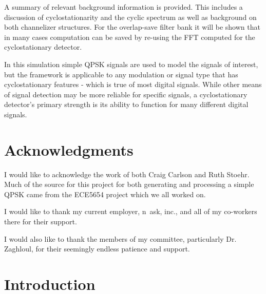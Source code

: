 \documentclass[12pt,dvips]{report}
\begin{document}
A summary of relevant background information is provided.  This includes a
discussion of cyclostationarity and the cyclic spectrum as well as background
on both channelizer structures. For the overlap-save filter bank it will be 
shown that in many cases computation can be saved by re-using the FFT computed
for the cyclostationary detector.

In this simulation simple QPSK signals are used to model the signals of 
interest, but the framework is applicable to any modulation or signal type
that has cyclostationary features - which is true of most digital signals. 
While other means of signal detection may be more reliable for specific signals,
a cyclostationary detector's primary strength is its ability to function for many
different digital signals.

\vfill



\pagebreak

\chapter*{Acknowledgments}
I would like to acknowledge the work of both Craig Carlson and Ruth Stoehr. Much
of the source for this project for both generating and processing a simple QPSK
came from the ECE5654 project which we all worked on.

I would like to thank my current employer, n~ask, inc., and all of my co-workers
there for their support.

I would also like to thank the members of my committee, particularly Dr.
Zaghloul, for their seemingly endless patience and support.

\tableofcontents
\pagebreak

\listoffigures
\pagebreak

\listoftables
\pagebreak

\pagestyle{myheadings}

\chapter{Introduction}
\label{sec:intro}
\end{document}
